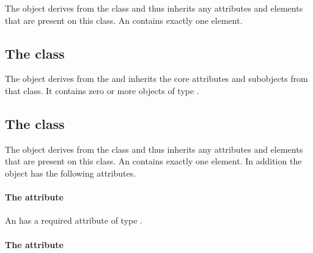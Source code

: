 
The \AnalyticGeometry object derives from the \GeometryDefinition class
and thus inherits any attributes and elements that are present on this
class.
An \AnalyticGeometry contains exactly one \ListOfAnalyticVolumes
element.
\subsection{The  class}
\label{listofanalyticvolumes-class}


The \ListOfAnalyticVolumes object derives from the  and
inherits the core attributes and subobjects from that class. It contains
zero or more objects of type \AnalyticVolume.

\subsection{The  class}
\label{analyticvolume-class}




The \AnalyticVolume object derives from the \SBase class and thus
inherits any attributes and elements that are present on this class.
An \AnalyticVolume contains exactly one  element.
In addition the \AnalyticVolume object has the following attributes.

\paragraph{The \fixttspace{} attribute}

An \AnalyticVolume has a required attribute  of type
.


\paragraph{The \fixttspace{} attribute}

